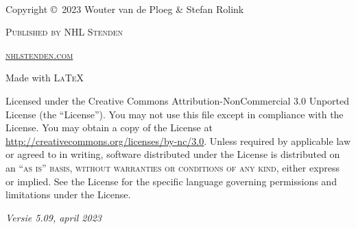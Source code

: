 \documentclass[11pt,fleqn]{book} %
\begin{document}

\newpage
~\vfill
\thispagestyle{empty}

\noindent Copyright \copyright\ 2023 Wouter van de Ploeg \& Stefan Rolink %

\noindent \textsc{Published by NHL Stenden} %

\noindent \textsc{\href{http://www.nhlstenden.com}{nhlstenden.com}} %

\noindent Made with \textsc{\LaTeX}

\noindent Licensed under the Creative Commons Attribution-NonCommercial 3.0 Unported License (the ``License''). You may not use this file except in compliance with the License. You may obtain a copy of the License at \url{http://creativecommons.org/licenses/by-nc/3.0}. Unless required by applicable law or agreed to in writing, software distributed under the License is distributed on an \textsc{``as is'' basis, without warranties or conditions of any kind}, either express or implied. See the License for the specific language governing permissions and limitations under the License. %

\noindent \textit{Versie 5.09, april 2023} %




\pagestyle{empty} %

\renewcommand{\contentsname}{Inhoudsopgave}
\tableofcontents %

\cleardoublepage %

\pagestyle{fancy} %

\end{document}
